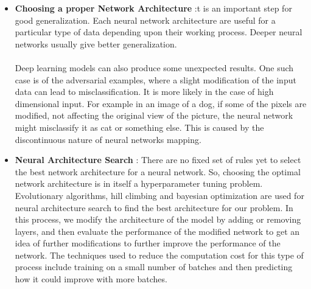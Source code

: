 \documentclass{article}
\begin{document}
      \begin{itemize}
        \item \textbf{Choosing a proper Network Architecture} :t is an important step for good generalization. Each neural network architecture are useful for a particular type of data depending upon their working process. Deeper neural networks usually give better generalization. 
          \paragraph{} Deep learning models can also produce some unexpected results. One such case is of the adversarial examples, where a slight modification of the input data can lead to misclassification. It is more likely in the case of high dimensional input. For example in an image of a dog, if some of the pixels are modified, not affecting the original view of the picture, the neural network might misclassify it as cat or something else. This is caused by the discontinuous nature of neural networks mapping.
        \item \textbf{Neural Architecture Search} : There are no fixed set of rules yet to select the best network architecture for a neural network. So, choosing the optimal network architecture is in itself a hyperparameter tuning problem. Evolutionary algorithms, hill climbing and bayesian optimization are used for neural architecture search to find the best architecture for our problem. In this process, we modify the architecture of the model by adding or removing layers, and then evaluate the performance of the modified network to get an idea of further modifications to further improve the performance of the network. The techniques used to reduce the computation cost for this type of process include training on a small number of batches and then predicting how it could improve with more batches. 

\end{itemize}
\end{document}
